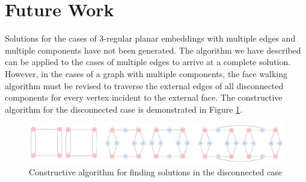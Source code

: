 \documentclass[12pt]{article}
\begin{document}
\section{Future Work}

Solutions for the cases of 3-regular planar embeddings with multiple edges and multiple components have not been generated. The algorithm we have described can be applied to the cases of multiple edges to arrive at a complete solution. However, in the cases of a graph with multiple components, the face walking algorithm must be revised to traverse the external edges of all disconnected components for every vertex incident to the external face. The constructive algorithm for the disconnected case is demonstrated in Figure \ref{Figure10}.    

\begin{figure}[H]
    \includegraphics[scale=.4,center]{Figure10}
    \caption{Constructive algorithm for finding solutions in the disconnected case}
    \label{Figure10}
\end{figure}



\end{document}
